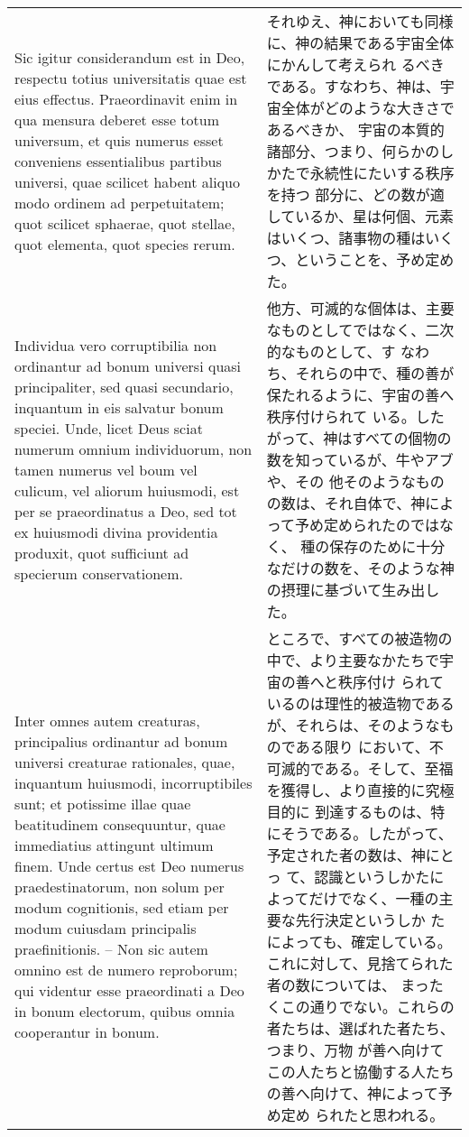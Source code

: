 \documentclass[10pt]{jsarticle} %
\begin{document}
\begin{longtable}{p{21em}p{21em}}
\\


Sic igitur
considerandum est in Deo, respectu totius universitatis quae est eius
effectus. Praeordinavit enim in qua mensura deberet esse totum
universum, et quis numerus esset conveniens essentialibus partibus
universi, quae scilicet habent aliquo modo ordinem ad perpetuitatem;
quot scilicet sphaerae, quot stellae, quot elementa, quot species
rerum. 


&

それゆえ、神においても同様に、神の結果である宇宙全体にかんして考えられ
るべきである。すなわち、神は、宇宙全体がどのような大きさであるべきか、
宇宙の本質的諸部分、つまり、何らかのしかたで永続性にたいする秩序を持つ
部分に、どの数が適しているか、星は何個、元素はいくつ、諸事物の種はいく
つ、ということを、予め定めた。


\\


Individua vero corruptibilia non ordinantur ad bonum universi
quasi principaliter, sed quasi secundario, inquantum in eis salvatur
bonum speciei. Unde, licet Deus sciat numerum omnium individuorum, non
tamen numerus vel boum vel culicum, vel aliorum huiusmodi, est per se
praeordinatus a Deo, sed tot ex huiusmodi divina providentia produxit,
quot sufficiunt ad specierum conservationem. 

&

他方、可滅的な個体は、主要なものとしてではなく、二次的なものとして、す
なわち、それらの中で、種の善が保たれるように、宇宙の善へ秩序付けられて
いる。したがって、神はすべての個物の数を知っているが、牛やアブや、その
他そのようなものの数は、それ自体で、神によって予め定められたのではなく、
種の保存のために十分なだけの数を、そのような神の摂理に基づいて生み出し
た。


\\

Inter omnes autem
creaturas, principalius ordinantur ad bonum universi creaturae
rationales, quae, inquantum huiusmodi, incorruptibiles sunt; et
potissime illae quae beatitudinem consequuntur, quae immediatius
attingunt ultimum finem. Unde certus est Deo numerus praedestinatorum,
non solum per modum cognitionis, sed etiam per modum cuiusdam
principalis praefinitionis. -- Non sic autem omnino est de numero
reproborum; qui videntur esse praeordinati a Deo in bonum electorum,
quibus omnia cooperantur in bonum. 



&

ところで、すべての被造物の中で、より主要なかたちで宇宙の善へと秩序付け
られているのは理性的被造物であるが、それらは、そのようなものである限り
において、不可滅的である。そして、至福を獲得し、より直接的に究極目的に
到達するものは、特にそうである。したがって、予定された者の数は、神にとっ
て、認識というしかたによってだけでなく、一種の主要な先行決定というしか
たによっても、確定している。これに対して、見捨てられた者の数については、
まったくこの通りでない。これらの者たちは、選ばれた者たち、つまり、万物
が善へ向けてこの人たちと協働する人たちの善へ向けて、神によって予め定め
られたと思われる。




\end{longtable}
\end{document}
